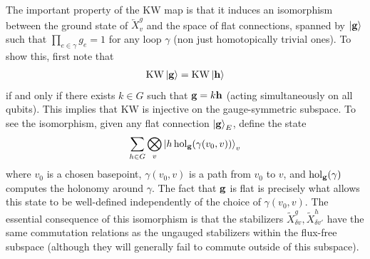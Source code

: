 \documentclass{article}
\theoremstyle{definition}
\theoremstyle{definition}
\newcommand{\KW}{\mathrm{KW}}
\newcommand{\hol}{\operatorname{hol}}
\begin{document}
The important property of the $\KW$ map is that it induces an isomorphism
between the ground state of $\overleftarrow X_{v}^g$ and the space of flat
connections, spanned by $\ket{\vb g}$ such that $\prod_{e \in \gamma}g_e = 1$
for any loop $\gamma$ (non just homotopically trivial ones). To show this, first
note that
\begin{align}
  \KW\ket{\vb g}  = \KW \ket{\vb h}
\end{align}
if and only if there exists $k \in G$ such that $\vb g = k\vb h$ (acting
simultaneously on all qubits). This implies that $\KW$ is injective on the
gauge-symmetric subspace. To see the isomorphism, given any flat connection
$\ket{\vb g}_E$, define the state
\begin{align}
\sum_{h \in G}\bigotimes_v
\ket{h\hol_{\vb g}(\gamma(v_0, v))}_v
\end{align}
where $v_0$ is a chosen basepoint, $\gamma(v_0, v)$ is a path from $v_0$ to
$v$, and $\hol_{\vb g}(\gamma)$ computes the holonomy around
$\gamma$. The fact that $\vb g$ is flat is precisely what allows this state to
be well-defined independently of the choice of $\gamma(v_0, v)$. The essential
consequence of this isomorphism is that the stabilizers $\widetilde X_{\delta
  v}^g, \widetilde X_{\delta v'}^h$ have the same commutation relations as the
ungauged stabilizers within the flux-free subspace (although they will generally
fail to commute outside of this subspace).
\end{document}
